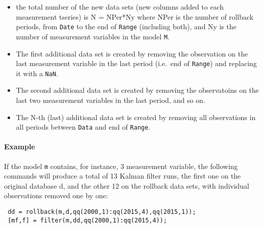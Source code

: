  \begin{itemize}
 \item
   the total number of the new data sets (new columns added to each
   measurement tseries) is N = NPer*Ny where NPer is the number of
   rollback periods, from \texttt{Date} to the end of \texttt{Range}
   (including both), and Ny is the number of measurement variables in the
   model \texttt{M}.
 \item
   The first additional data set is created by removing the observation
   on the last measurement variable in the last period (i.e.~end of
   \texttt{Range}) and replacing it with a \texttt{NaN}.
 \item
   The second additional data set is created by removing the observatoins
   on the last two measurement variables in the last period, and so on.
 \item
   The N-th (last) additional data set is created by removing all
   observations in all periods between \texttt{Data} and end of
   \texttt{Range}.
 \end{itemize}
 
 \paragraph{Example}
 
 If the model \texttt{m} contains, for instance, 3 measurement variable,
 the following commands will produce a total of 13 Kalman filter runs,
 the first one on the original database d, and the other 12 on the
 rollback data sets, with individual observations removed one by one:
 
 \begin{verbatim}
 dd = rollback(m,d,qq(2000,1):qq(2015,4),qq(2015,1));
 [mf,f] = filter(m,dd,qq(2000,1):qq(2015,4));
 \end{verbatim}


